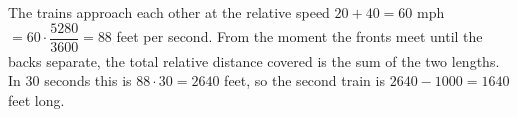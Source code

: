 The trains approach each other at the relative speed $20+40=60$ mph $=60\cdot\dfrac{5280}{3600}=88$ feet per second. From the moment the fronts meet until the backs separate, the total relative distance covered is the sum of the two lengths. In $30$ seconds this is $88\cdot30=2640$ feet, so the second train is $2640-1000=\boxed{1640}$ feet long.

